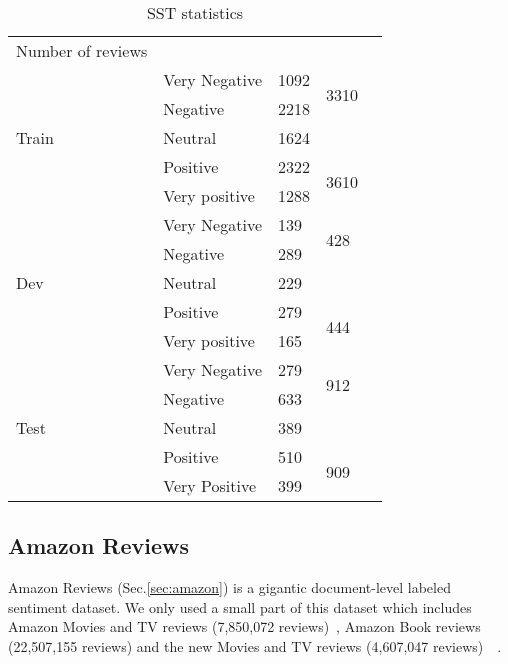 \begin{table}[H]
    \centering
    \caption{SST statistics}
    \label{table:sststatistic_5}
    \begin{tabular}{lllll}
        Number of reviews       &               &      &                       &  \\ \cline{1-4}
        \multirow{5}{*}{Train} & Very Negative & 1092 & \multirow{2}{*}{3310} &  \\ \cline{2-3}
        & Negative      & 2218 &                       &  \\ \cline{2-4}
        & Neutral       & 1624 &                       &  \\ \cline{2-4}
        & Positive      & 2322 & \multirow{2}{*}{3610} &  \\ \cline{2-3}
        & Very positive & 1288 &                       &  \\ \cline{1-4}
        \multirow{5}{*}{Dev}   & Very Negative & 139  & \multirow{2}{*}{428}  &  \\ \cline{2-3}
        & Negative      & 289  &                       &  \\ \cline{2-4}
        & Neutral       & 229  &                       &  \\ \cline{2-4}
        & Positive      & 279  & \multirow{2}{*}{444}  &  \\ \cline{2-3}
        & Very positive & 165  &                       &  \\ \cline{1-4}
        \multirow{5}{*}{Test}  & Very Negative & 279  & \multirow{2}{*}{912}  &  \\ \cline{2-3}
        & Negative      & 633  &                       &  \\ \cline{2-4}
        & Neutral       & 389  &                       &  \\ \cline{2-4}
        & Positive      & 510  & \multirow{2}{*}{909}  &  \\ \cline{2-3}
        & Very Positive & 399  &                       &  \\ \cline{2-4}
    \end{tabular}
\end{table}
\subsection{Amazon Reviews}
Amazon Reviews (Sec.\ref{sec:amazon}) is a gigantic document-level labeled sentiment dataset.
We only used a small part of this dataset which includes Amazon Movies and TV reviews (7,850,072 reviews)~\cite{mcauley2013hidden}, Amazon Book reviews (22,507,155 reviews) and the new Movies and TV reviews (4,607,047 reviews)~\cite{McAuleyTSH15}~\cite{HeM16}.

